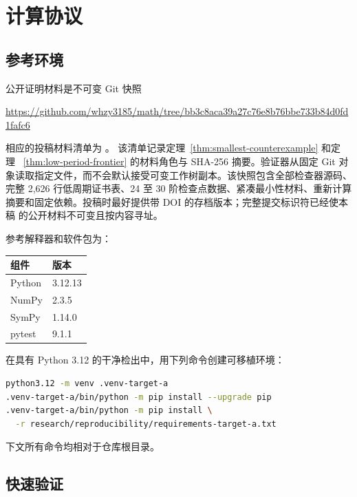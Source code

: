 \section{计算协议}\label{app:computational-protocol}

\subsection{参考环境}

公开证明材料是不可变 Git 快照

\begin{center}
\url{https://github.com/whzy3185/math/tree/bb3c8aca39a27c76e8b76bbe733b84d0fd1fafc6}
\end{center}

相应的投稿材料清单为
\allowbreak{}\allowbreak{}。
该清单记录定理~\ref{thm:smallest-counterexample} 和定理~
\ref{thm:low-period-frontier} 的材料角色与 SHA-256 摘要。验证器从固定 Git
对象读取指定文件，而不会默认接受可变工作树副本。该快照包含全部检查器源码、
完整 2,626 行低周期证书表、24 至 30 阶检查点数据、紧凑最小性材料、重新计算
摘要和固定依赖。投稿时最好提供带 DOI 的存档版本；完整提交标识符已经使本稿
的公开材料不可变且按内容寻址。

参考解释器和软件包为：

\begin{center}
\begin{tabular}{ll}
\toprule
组件 & 版本 \\
\midrule
Python & 3.12.13 \\
NumPy & 2.3.5 \\
SymPy & 1.14.0 \\
pytest & 9.1.1 \\
\bottomrule
\end{tabular}
\end{center}

在具有 Python 3.12 的干净检出中，用下列命令创建可移植环境：

\begin{lstlisting}[language=bash]
python3.12 -m venv .venv-target-a
.venv-target-a/bin/python -m pip install --upgrade pip
.venv-target-a/bin/python -m pip install \
  -r research/reproducibility/requirements-target-a.txt
\end{lstlisting}

下文所有命令均相对于仓库根目录。

\subsection{快速验证}

